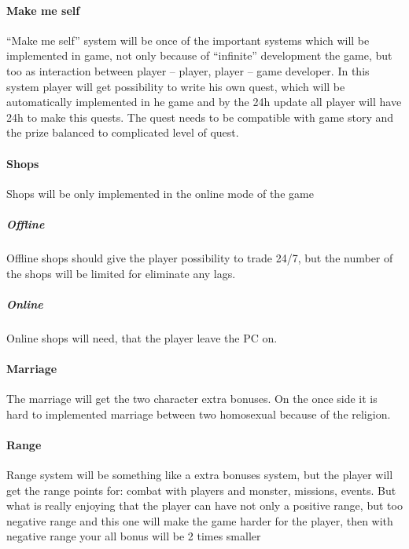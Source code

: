 \documentclass[parskip=full]{scrartcl}
\begin{document}
					\paragraph{Make me self} \vspace{-5mm}
						\par \begingroup
						\leftskip=2cm
						\noindent
								“Make me self” system will be once of the important systems which will be implemented in game, not only because of “infinite” development the game, but too as interaction between player – player, player – game developer. In this system player will get possibility to write his own quest, which will be automatically implemented in he game and by the 24h update all player will have 24h to make this quests. The quest needs to be compatible with game story and the prize balanced to complicated level of quest.
						\par \endgroup
					\paragraph{Shops} \vspace{-5mm}
						\par \begingroup
						\leftskip=2cm
						\noindent
								Shops will be only implemented in the online mode of the game \\
						\par \endgroup
						\subparagraph{Offline}
							\par \begingroup
							\leftskip=2cm
							\noindent
									Offline shops should give the player possibility to trade 24/7, but the number of the shops will be limited for eliminate any lags.
							\par \endgroup
						\subparagraph{Online}
							\par \begingroup
							\leftskip=2cm
							\noindent
									Online shops will need, that the player leave the PC on.
							\par \endgroup
					\paragraph{Marriage} \vspace{-5mm}
						\par \begingroup
						\leftskip=2cm
						\noindent
								The marriage will get the two character extra bonuses. On the once side it is hard to implemented marriage between two homosexual because of the religion.
						\par \endgroup
					\paragraph{Range} \vspace{-5mm}
						\par \begingroup
						\leftskip=2cm
						\noindent
								Range system will be something like a extra bonuses system, but the player will get the range points for: combat with players and monster, missions, events. But what is really enjoying that the player can have not only a positive range, but too negative range and this one will make the game harder for the player, then with negative range your all bonus will be 2 times smaller
						\par \endgroup
\end{document}
